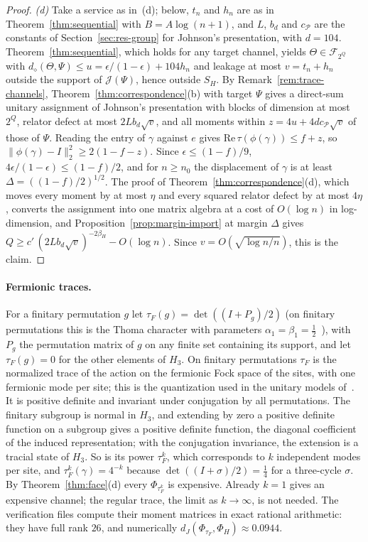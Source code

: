 \documentclass[11pt,a4paper]{article}
\theoremstyle{plain}
\theoremstyle{definition}
\theoremstyle{remark}
\newcommand{\dJ}{d_J}
\newcommand{\ddia}{d_\diamond}
\begin{document}
\begin{proof}
\emph{(d)} Take a service as in~(d); below, $t_n$ and $h_n$ are as in Theorem~\ref{thm:sequential} with $B=A\log(n+1)$, and $L$, $b_d$ and
$c_{\mathcal P}$ are the constants of Section~\ref{sec:res-group} for Johnson's presentation, with $d=104$. Theorem~\ref{thm:sequential}, which holds
for any target channel, yields $\Theta\in\mathcal F_{2^Q}$ with $\ddia(\Theta,\Psi)\le u=\epsilon/(1-\epsilon)+104h_n$ and leakage at most $v=t_n+h_n$
outside the support of $\mathcal J(\Psi)$, hence outside $S_H$. By Remark~\ref{rem:trace-channels}, Theorem~\ref{thm:correspondence}(b) with target
$\Psi$ gives a direct-sum unitary assignment of Johnson's presentation with blocks of dimension at most $2^Q$, relator defect at most
$2Lb_d\sqrt v$, and all moments within $z=4u+4dc_{\mathcal P}\sqrt v$ of those of $\Psi$. Reading the entry of $\gamma$ against $e$ gives
$\mathrm{Re}\,\tau(\phi(\gamma))\le f+z$, so $\|\phi(\gamma)-I\|_2^2\ge2(1-f-z)$. Since $\epsilon\le(1-f)/9$, $4\epsilon/(1-\epsilon)\le(1-f)/2$, and for
$n\ge n_0$ the displacement of $\gamma$ is at least $\Delta=((1-f)/2)^{1/2}$. The proof of Theorem~\ref{thm:correspondence}(d), which moves every
moment by at most $\eta$ and every squared relator defect by at most $4\eta$, converts the assignment into one matrix algebra at a cost of $O(\log n)$ in log-dimension, and Proposition~\ref{prop:margin-import} at margin
$\Delta$ gives $Q\ge c'\,(2Lb_d\sqrt v)^{-2\beta_H}-O(\log n)$. Since
$v=O(\sqrt{\log n/n})$, this is the claim.
\end{proof}

\paragraph{Fermionic traces.} For a finitary permutation $g$ let $\tau_F(g)=\det((I+P_g)/2)$ (on finitary permutations this is the Thoma
character with parameters $\alpha_1=\beta_1=\frac12$~\cite{Thoma1964}), with $P_g$ the permutation matrix of $g$ on any
finite set containing its support, and let $\tau_F(g)=0$ for the other elements of $H_3$. On finitary permutations $\tau_F$ is the normalized trace
of the action on the fermionic Fock space of the sites, with one fermionic mode per site; this is the quantization used in the unitary models
of~\cite[Section~6.2]{DouglasMghirbiA}. It is positive definite and invariant under conjugation by all permutations. The finitary subgroup is
normal in $H_3$, and extending by zero a positive definite function on a subgroup gives a positive definite function, the diagonal coefficient of
the induced representation; with the conjugation invariance, the extension is a tracial state of $H_3$. So is its power $\tau_F^k$, which
corresponds to $k$ independent modes per site, and $\tau_F^k(\gamma)=4^{-k}$ because $\det((I+\sigma)/2)=\frac14$ for a three-cycle $\sigma$. By
Theorem~\ref{thm:face}(d) every $\Phi_{\tau_F^k}$ is expensive. Already $k=1$ gives an expensive channel; the regular trace, the limit as
$k\to\infty$, is not needed. The verification files compute their moment matrices in exact rational arithmetic: they have full rank $26$,
and numerically $\dJ(\Phi_{\tau_F},\Phi_H)\approx0.0944$.
\end{document}
